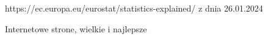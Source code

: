 \documentclass[polish,12pt,twoside,a4paper]{report}
\begin{document}




\newpage

\newpage

\newpage

\newpage

\begin{thebibliography}{6}

 https://ec.europa.eu/eurostat/statistics-explained/ z dnia 26.01.2024

Internetowe strone, wielkie i najlepsze

\end{thebibliography}
\newpage


\end{document}
